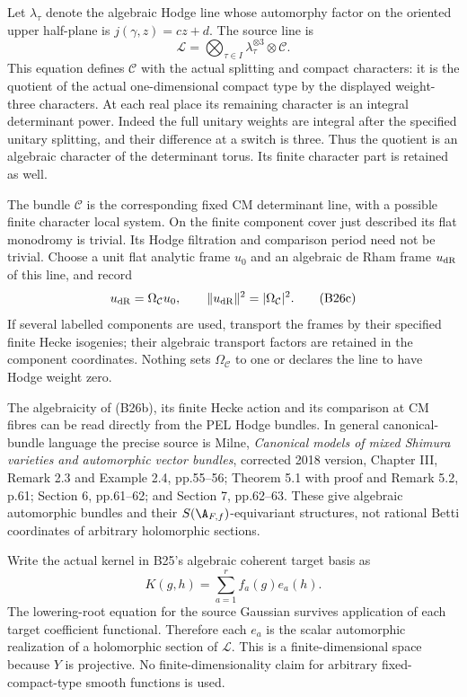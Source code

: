 \documentclass[11pt]{article}
\providecommand{\mathscr}[1]{\mathcal{#1}}
\theoremstyle{definition}\newtheorem{definition}[theorem]{Definition}\newtheorem{remark}[theorem]{Remark}
\begin{document}
Let $\lambda_\tau$ denote the algebraic Hodge line whose
automorphy factor on the oriented upper half-plane is
$j(\gamma,z)=cz+d$.  The source line is
\[
 \mathscr L=
       \bigotimes_{\tau\in I}\lambda_\tau^{\otimes3}
                  \otimes\mathscr C.
 \tag{B26b}
\]
This equation defines $\mathscr C$ with the actual splitting
and compact characters: it is the quotient of the actual
one-dimensional compact type by the displayed weight-three
characters.  At each real place its remaining character is
an integral determinant power.  Indeed the full unitary
weights are integral after the specified unitary splitting,
and their difference at a switch is three.  Thus the quotient
is an algebraic character of the determinant torus.  Its
finite character part is retained as well.

The bundle $\mathscr C$ is the corresponding fixed CM
determinant line, with a possible finite character local
system.  On the finite component cover just described its
flat monodromy is trivial.  Its Hodge filtration and comparison
period need not be trivial.  Choose a unit flat analytic frame
$u_0$ and an algebraic de Rham frame $u_{\rm dR}$ of this line,
and record
\[
                 u_{\rm dR}=\Omega_{\mathscr C}u_0,
             \qquad \|u_{\rm dR}\|^2=|\Omega_{\mathscr C}|^2.
 \tag{B26c}
\]
If several labelled components are used, transport the frames
by their specified finite Hecke isogenies; their algebraic
transport factors are retained in the component coordinates.
Nothing sets $\Omega_{\mathscr C}$ to one or declares the line
to have Hodge weight zero.

The algebraicity of (B26b), its finite Hecke action and its
comparison at CM fibres can be read directly from the PEL
Hodge bundles.  In general canonical-bundle language the
precise source is Milne, \emph{Canonical models of mixed
Shimura varieties and automorphic vector bundles}, corrected
2018 version, Chapter III, Remark 2.3 and Example 2.4,
pp.55--56; Theorem 5.1 with proof and Remark 5.2, p.61;
Section 6, pp.61--62; and Section 7, pp.62--63.
These give algebraic automorphic bundles and their
$S(\A_{F,f})$-equivariant structures, not rational Betti
coordinates of arbitrary holomorphic sections.

Write the actual kernel in B25's algebraic coherent target
basis as
\[
                  K(g,h)=\sum_{a=1}^r f_a(g)e_a(h).
 \tag{B26d}
\]
The lowering-root equation for the source Gaussian survives
application of each target coefficient functional.  Therefore
each $e_a$ is the scalar automorphic realization of a
holomorphic section of $\mathscr L$.  This is a finite-dimensional
space because $Y$ is projective.  No finite-dimensionality
claim for arbitrary fixed-compact-type smooth functions is used.
\end{document}

